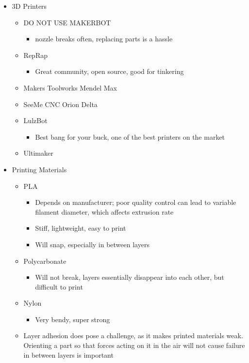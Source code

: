 \documentclass{article}
\begin{document}
\begin{spacing}{1.1}
\newpage

\begin{itemize}
	\item 3D Printers
	\begin{itemize}
		\item DO NOT USE MAKERBOT
		\begin{itemize}
			\item nozzle breaks often, replacing parts is a hassle
		\end{itemize}
		\item RepRap
		\begin{itemize}
			\item Great community, open source, good for tinkering
		\end{itemize}
		\item Makers Toolworks Mendel Max
		\item SeeMe CNC Orion Delta
		\item LulzBot
		\begin{itemize}
			\item Best bang for your buck, one of the best printers on the market
		\end{itemize}
		\item Ultimaker
	\end{itemize}
	\item Printing Materials
	\begin{itemize}
		\item PLA
		\begin{itemize}
			\item Depends on manufacturer; poor quality control can lead to variable filament diameter, which affects extrusion rate
			\item Stiff, lightweight, easy to print
			\item Will snap, especially in between layers
		\end{itemize}
		\item Polycarbonate
		\begin{itemize}
			\item Will not break, layers essentially disappear into each other, but difficult to print
		\end{itemize}
		\item Nylon
		\begin{itemize}
			\item Very bendy, super strong
		\end{itemize}
		\item Layer adhesion does pose a challenge, as it makes printed materials weak. Orienting a part so that forces acting on it in the air will not cause failure in between layers is important

\end{itemize}
\end{itemize}
\end{spacing}
\end{document}

